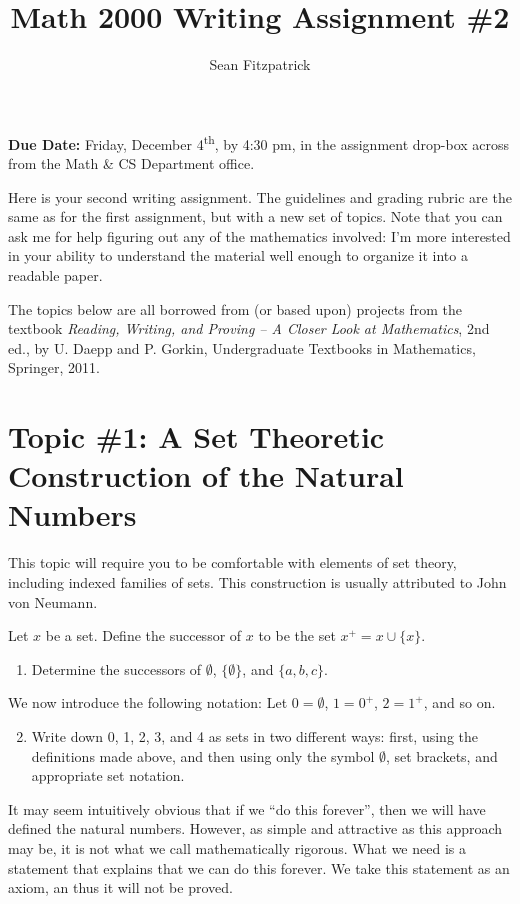 \documentclass[letterpaper,12pt]{article}
\title{Math 2000 Writing Assignment \#2}
\author{Sean Fitzpatrick}
\theoremstyle{definition}
\begin{document}
 \maketitle

{\bf Due Date:} Friday, December 4\textsuperscript{th}, by 4:30 pm, in the assignment drop-box across from the Math \& CS Department office.

\medskip

Here is your second writing assignment. The guidelines and grading rubric are the same as for the first assignment, but with a new set of topics. Note that you can ask me for help figuring out any of the mathematics involved: I'm more interested in your ability to understand the material well enough to organize it into a readable paper.

The topics below are all borrowed from (or based upon) projects from the textbook {\em Reading, Writing, and Proving -- A Closer Look at Mathematics}, 2nd ed., by U. Daepp and P. Gorkin, Undergraduate Textbooks in Mathematics, Springer, 2011.

\section*{Topic \#1: A Set Theoretic Construction of the Natural Numbers}
This topic will require you to be comfortable with elements of set theory, including indexed families of sets. This construction is usually attributed to John von Neumann.

Let $x$ be a set. Define the successor of $x$ to be the set $x^+ = x\cup \{x\}$.
\begin{enumerate}
 \item Determine the successors of $\emptyset$, $\{\emptyset\}$, and $\{a,b,c\}$.
\end{enumerate}
We now introduce the following notation: Let $0=\emptyset$, $1=0^+$, $2=1^+$, and so on.
\begin{enumerate}\setcounter{enumi}{1}
 \item Write down 0, 1, 2, 3, and 4 as sets in two different ways: first, using the definitions made above, and then using only the symbol $\emptyset$, set brackets, and appropriate set notation.
\end{enumerate}
It may seem intuitively obvious that if we ``do this forever'', then we will have defined the natural numbers. However, as simple and attractive as this approach may be, it is not what we call mathematically rigorous. What we need is a statement that explains that we can do this forever. We take this statement as an axiom, an thus it will not be proved.
\end{document}
